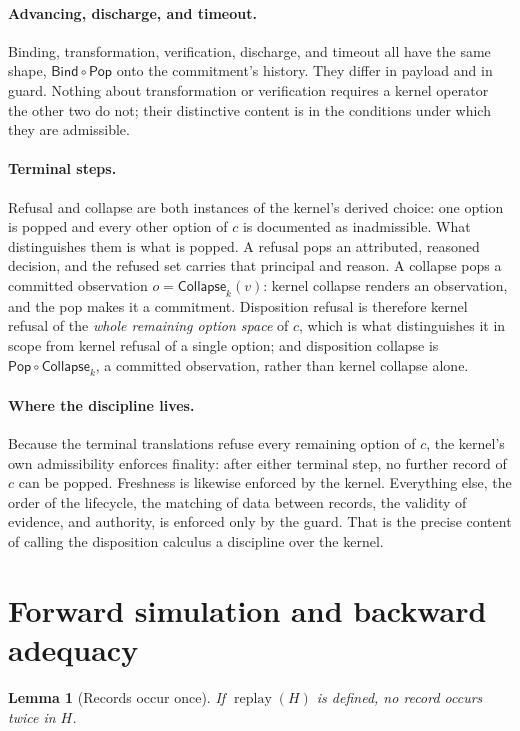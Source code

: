 \documentclass[11pt,openany]{book}
\newtheorem{lemma}[theorem]{Lemma}
\theoremstyle{remark}
\newcommand{\Pop}{\mathsf{Pop}}
\newcommand{\Bind}{\mathsf{Bind}}
\newcommand{\Collapse}{\mathsf{Collapse}}
\newcommand{\replay}{\operatorname{replay}}
\begin{document}
\paragraph{Advancing, discharge, and timeout.} Binding, transformation,
verification, discharge, and timeout all have the same shape, $\Bind\circ\Pop$ onto
the commitment's history. They differ in payload and in guard. Nothing
about transformation or verification requires a kernel operator the other
two do not; their distinctive content is in the conditions under which
they are admissible.

\paragraph{Terminal steps.} Refusal and collapse are both instances of the
kernel's derived choice: one option is popped and every other option of
$c$ is documented as inadmissible. What distinguishes them is what is
popped. A refusal pops an attributed, reasoned decision, and the refused
set carries that principal and reason. A collapse pops a committed
observation $o=\Collapse_k(v)$: kernel collapse renders an observation,
and the pop makes it a commitment. Disposition refusal is therefore kernel
refusal of the \emph{whole remaining option space} of $c$, which is what
distinguishes it in scope from kernel refusal of a single option; and
disposition collapse is $\Pop\circ\Collapse_k$, a committed observation,
rather than kernel collapse alone.

\paragraph{Where the discipline lives.} Because the terminal translations
refuse every remaining option of $c$, the kernel's own admissibility
enforces finality: after either terminal step, no further record of $c$
can be popped. Freshness is likewise enforced by the kernel. Everything
else, the order of the lifecycle, the matching of data between records,
the validity of evidence, and authority, is enforced only by the guard.
That is the precise content of calling the disposition calculus a
discipline over the kernel.

\section{Forward simulation and backward adequacy}

\begin{lemma}[Records occur once]\label{lem:once}
If $\replay(H)$ is defined, no record occurs twice in $H$.
\end{lemma}
\end{document}
